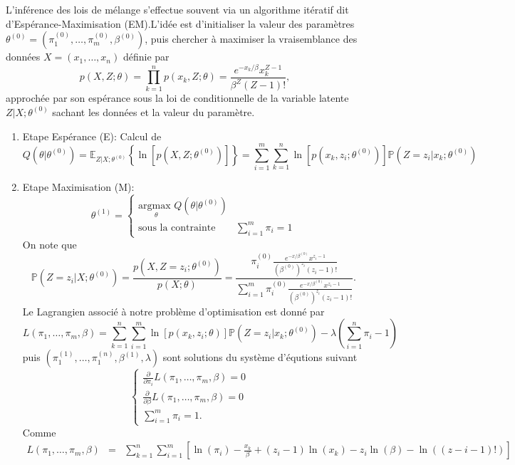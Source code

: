 \documentclass[8pt,notheorems]{beamer}
\def \E{\mathbb E}
\def \P {\mathbb P}
\theoremstyle{definition}
\theoremstyle{example}
\theoremstyle{mystyle}
\theoremstyle{plain}
\begin{document}
\begin{frame}[allowframebreaks]
L'inférence des lois de mélange s'effectue souvent via un algorithme itératif dit d'Espérance-Maximisation (EM).L'idée est d'initialiser la valeur des paramètres $\theta^{(0)} = \left(\pi^{(0)}_1,\ldots, \pi^{(0)}_m, \beta^{(0)}\right)$, puis chercher à maximiser la vraisemblance des données $X=(x_1,\ldots, x_n)$ définie par
$$
p(X,Z;\theta)=\prod_{k=1}^{n}p(x_k,Z;\theta)=\frac{e^{-x_k/\beta}x_{k}^{Z-1}}{\beta^{Z}(Z-1)!},
$$
approchée par son espérance sous la loi de conditionnelle de la variable latente $Z|X;\theta^{(0)}$ sachant les données et la valeur du paramètre.
\begin{enumerate}
\item Etape Espérance (E): Calcul de
$$
Q\left(\theta|\theta^{(0)}\right)=\E_{Z|X;\theta^{(0)}}\left\{\ln\left[p(X,Z;\theta^{(0)})\right]\right\} =\sum_{i=1}^{m}\sum_{k=1}^n\ln\left[p(x_k,z_i;\theta^{(0)})\right]\P\left(Z=z_i|x_k;\theta^{(0)}\right)
$$
\item Etape Maximisation (M):
$$
\theta^{(1)} = \begin{cases}
\underset{\theta}{\text{argmax }} Q\left(\theta|\theta^{(0)}\right)&\\
\text{sous la contrainte }&\sum_{i=1}^{m}\pi_i=1
\end{cases}
$$
On note que
$$
\P\left(Z=z_i|X;\theta^{(0)}\right)=\frac{p(X,Z=z_i;\theta^{(0)})}{p(X;\theta)}=\frac{\pi^{ (0)}_{i}\frac{e^{-x/\beta^{(0)}}x^{z_i-1}}{\left(\beta^{(0)}\right)^{z_i}(z_i-1)!}}{\sum_{i=1}^{m}\pi^{ (0)}_{i}\frac{e^{-x/\beta^{(0)}}x^{z_i-1}}{\left(\beta^{(0)}\right)^{z_i}(z_i-1)!}}.
$$
Le Lagrangien associé à notre problème d'optimisation est donné par
$$
L(\pi_1,\ldots, \pi_m,\beta)= \sum_{k=1}^n\sum_{i=1}^{m}\ln\left[p(x_k,z_i;\theta)\right]\P\left(Z=z_i|x_k;\theta^{(0)}\right)-\lambda\left(\sum_{i=1}^{n}\pi_i - 1\right)
$$
puis $\left(\pi_1^{(1)},\ldots,  \pi_1^{(n)}, \beta^{(1)},\lambda\right)$ sont solutions du système d'équtions suivant
$$
\begin{cases}
\frac{\partial}{\partial \pi_i}L(\pi_1,\ldots, \pi_m,\beta)=0&\\
\frac{\partial}{\partial \beta}L(\pi_1,\ldots, \pi_m,\beta)=0&\\
\sum_{i=1}^{m}\pi_i=1.&
\end{cases}
$$
Comme
\begin{eqnarray*}
L(\pi_1,\ldots, \pi_m,\beta)&=& \sum_{k=1}^n\sum_{i=1}^{m}\left[\ln(\pi_i)-\frac{x_k}{\beta}+(z_i-1)\ln(x_k)-z_i\ln(\beta)-\ln((z-i-1)!)\right]\\

\end{eqnarray*}
\end{enumerate}
\end{frame}
\end{document}
